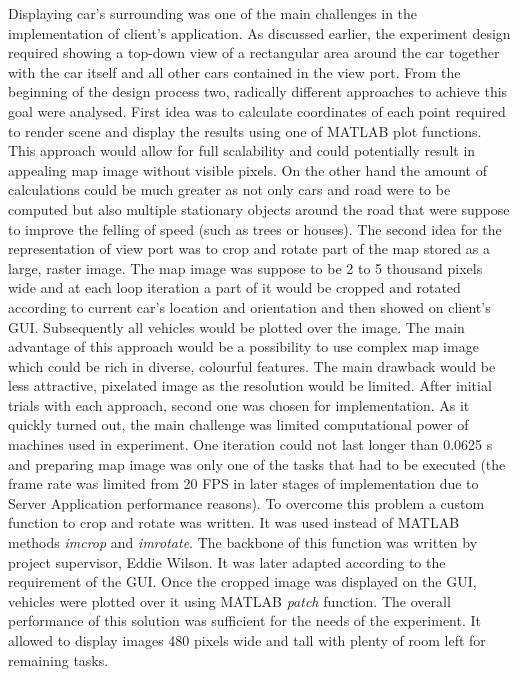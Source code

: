 \documentclass[11pt,english]{article}
\begin{document}
Displaying car's surrounding was one of the main challenges in the implementation of client's application. As discussed earlier, the experiment design required showing a top-down view of a rectangular area around the car together with the car itself and all other cars contained in the view port. From the beginning of the design process two, radically different approaches to achieve this goal were analysed. First idea was to calculate coordinates of each point required to render scene and display the results using one of MATLAB plot functions. This approach would allow for full scalability and could potentially result in appealing map image without visible pixels. On the other hand the amount of calculations could be much greater as not only cars and road were to be computed but also multiple stationary objects around the road that were suppose to improve the felling of speed (such as trees or houses). 
The second idea for the representation of view port was to crop and rotate part of the map stored as a large, raster image. The  map image was suppose to be 2 to 5 thousand pixels wide and at each loop iteration a part of it would be cropped and rotated according to current car's location and orientation and then showed on client's GUI. Subsequently all vehicles would be plotted over the image. The main advantage of this approach would be a possibility to use complex map image which could be rich in diverse, colourful features. The main drawback would be less attractive, pixelated image as the resolution would be limited. 
After initial trials with each approach, second one was chosen for implementation. As it quickly turned out, the main challenge was limited computational power of machines used in experiment. One iteration could not last longer than 0.0625 s and preparing map image was only one of the tasks that had to be executed (the frame rate was limited from 20 FPS in later stages of implementation due to Server Application performance reasons). To overcome this problem a custom function to crop and rotate was written. It was used instead of MATLAB methods \textit{imcrop} and \textit{imrotate}. The backbone of this function was written by project supervisor, Eddie Wilson. It was later adapted according to the requirement of the GUI. 
Once the cropped image was displayed on the GUI, vehicles were plotted over it using MATLAB \textit{patch} function. The overall performance of this solution was sufficient for the needs of the experiment. It allowed to display images 480 pixels wide and tall with plenty of room left for remaining tasks.
\end{document}
